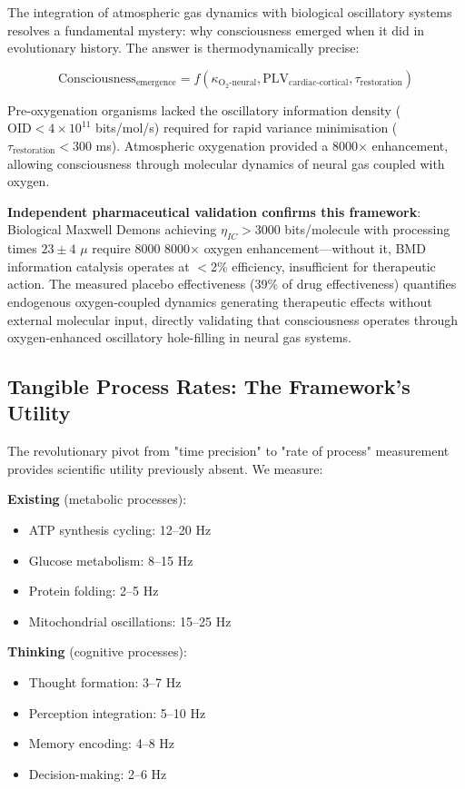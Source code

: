 \documentclass[12pt]{article}
\theoremstyle{remark}
\begin{document}
The integration of atmospheric gas dynamics with biological oscillatory systems resolves a fundamental mystery: why consciousness emerged when it did in evolutionary history. The answer is thermodynamically precise:

\begin{equation}
\text{Consciousness}_{\text{emergence}} = f(\kappa_{\text{O}_2\text{-neural}}, \text{PLV}_{\text{cardiac-cortical}}, \tau_{\text{restoration}})
\end{equation}

Pre-oxygenation organisms lacked the oscillatory information density ($\text{OID} < 4 \times 10^{11}$ bits/mol/s) required for rapid variance minimisation ($\tau_{\text{restoration}} < 300$ ms). Atmospheric oxygenation provided a 8000× enhancement, allowing consciousness through molecular dynamics of neural gas coupled with oxygen.

\textbf{Independent pharmaceutical validation confirms this framework}: Biological Maxwell Demons achieving $\eta_{IC} > 3000$ bits/molecule with processing times $23 \pm 4$ $\mu$ require 8000 8000× oxygen enhancement—without it, BMD information catalysis operates at $<$2\% efficiency, insufficient for therapeutic action. The measured placebo effectiveness (39\% of drug effectiveness) quantifies endogenous oxygen-coupled dynamics generating therapeutic effects without external molecular input, directly validating that consciousness operates through oxygen-enhanced oscillatory hole-filling in neural gas systems.

\subsection{Tangible Process Rates: The Framework's Utility}

The revolutionary pivot from "time precision" to "rate of process" measurement provides scientific utility previously absent. We measure:

\textbf{Existing} (metabolic processes):
\begin{itemize}
\item ATP synthesis cycling: 12--20 Hz
\item Glucose metabolism: 8--15 Hz
\item Protein folding: 2--5 Hz
\item Mitochondrial oscillations: 15--25 Hz
\end{itemize}

\textbf{Thinking} (cognitive processes):
\begin{itemize}
\item Thought formation: 3--7 Hz
\item Perception integration: 5--10 Hz
\item Memory encoding: 4--8 Hz
\item Decision-making: 2--6 Hz
\end{itemize}
\end{document}
